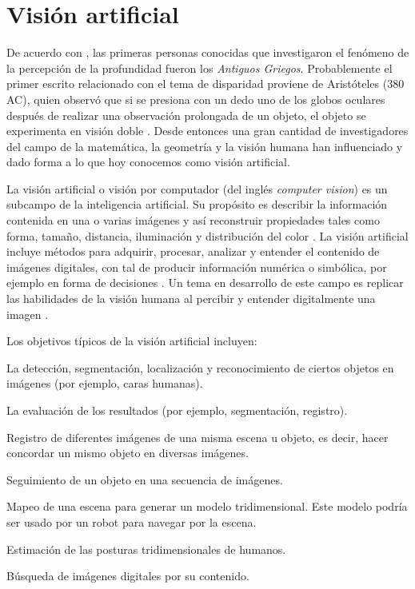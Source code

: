 \section{Visi\'{o}n artificial}
De acuerdo con \cite{university1995binocular}, las primeras personas conocidas que investigaron el fen\'{o}meno de la percepci\'{o}n de la profundidad fueron los \textit{Antiguos Griegos}. Probablemente el primer escrito relacionado con el tema de disparidad proviene de Arist\'{o}teles (380 AC), quien observ\'{o} que si se presiona con un dedo uno de los globos oculares despu\'{e}s de realizar una observaci\'{o}n prolongada de un objeto, el objeto se experimenta en visi\'{o}n doble \cite{Cyganek_Siebert_2009}. Desde entonces una gran cantidad de investigadores del campo de la matem\'{a}tica, la geometr\'{i}a y la visi\'{o}n humana han influenciado y dado forma a lo que hoy conocemos como visi\'{o}n artificial.

La visi\'{o}n artificial o visi\'{o}n por computador (del ingl\'{e}s \textit{computer vision}) es un subcampo de la inteligencia artificial. Su prop\'{o}sito es describir la informaci\'{o}n contenida en una o varias im\'{a}genes y as\'{i} reconstruir propiedades tales como forma, tamaño, distancia, iluminaci\'{o}n y distribuci\'{o}n del co\-lor \cite{Szeliski_2010,Shah_1983,Shapiro_Stockman_2001,Cyganek_Siebert_2009}. La visi\'{o}n artificial incluye m\'{e}todos para adquirir, procesar, analizar y entender el contenido de im\'{a}genes digitales, con tal de producir informaci\'{o}n num\'{e}rica o simb\'{o}lica, por ejemplo en forma de decisiones \cite{Shapiro_Stockman_2001,Jahne_Haubecker_Ray_2002}. Un tema en desarrollo de este campo es replicar las habilidades de la visi\'{o}n humana al percibir y entender digitalmente una imagen \cite{Sonka_Hlavac_Boyle_2007}.

Los objetivos t\'{i}picos de la visi\'{o}n artificial incluyen:
\begin{itemize*}
\item La detecci\'{o}n, segmentaci\'{o}n, localizaci\'{o}n y reconocimiento de ciertos objetos en im\'{a}genes (por ejemplo, caras humanas). 
\item La evaluaci\'{o}n de los resultados (por ejemplo, segmentaci\'{o}n, registro). 
\item Registro de diferentes im\'{a}genes de una misma escena u objeto, es decir, hacer concordar un mismo objeto en diversas im\'{a}genes. 
\item Seguimiento de un objeto en una secuencia de im\'{a}genes. 
\item Mapeo de una escena para generar un modelo tridimensional. Este modelo podr\'{i}a ser usado por un robot para navegar por la escena. 
\item Estimaci\'{o}n de las posturas tridimensionales de humanos. 
\item B\'{u}squeda de im\'{a}genes digitales por su contenido. 
\end{itemize*}

